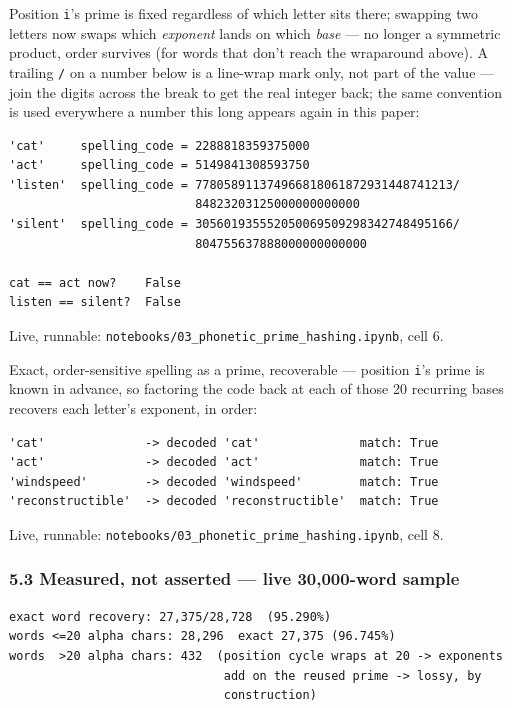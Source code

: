 \documentclass[
  10pt,
]{article}
\begin{document}
Position \texttt{i}'s prime is fixed regardless of which letter sits
there; swapping two letters now swaps which \emph{exponent} lands on
which \emph{base} --- no longer a symmetric product, order survives (for
words that don't reach the wraparound above). A trailing \texttt{/} on a
number below is a line-wrap mark only, not part of the value --- join
the digits across the break to get the real integer back; the same
convention is used everywhere a number this long appears again in this
paper:

\begin{verbatim}
'cat'     spelling_code = 2288818359375000
'act'     spelling_code = 5149841308593750
'listen'  spelling_code = 778058911374966818061872931448741213/
                          84823203125000000000000
'silent'  spelling_code = 305601935552050069509298342748495166/
                          804755637888000000000000

cat == act now?    False
listen == silent?  False
\end{verbatim}

Live, runnable: \texttt{notebooks/03\_phonetic\_prime\_hashing.ipynb},
cell 6.

Exact, order-sensitive spelling as a prime, recoverable --- position
\texttt{i}'s prime is known in advance, so factoring the code back at
each of those 20 recurring bases recovers each letter's exponent, in
order:

\begin{verbatim}
'cat'              -> decoded 'cat'              match: True
'act'              -> decoded 'act'              match: True
'windspeed'        -> decoded 'windspeed'        match: True
'reconstructible'  -> decoded 'reconstructible'  match: True
\end{verbatim}

Live, runnable: \texttt{notebooks/03\_phonetic\_prime\_hashing.ipynb},
cell 8.

\hypertarget{measured-not-asserted-live-30000-word-sample}{%
\subsubsection{5.3 Measured, not asserted --- live 30,000-word
sample}\label{measured-not-asserted-live-30000-word-sample}}

\begin{verbatim}
exact word recovery: 27,375/28,728  (95.290%)
words <=20 alpha chars: 28,296  exact 27,375 (96.745%)
words  >20 alpha chars: 432  (position cycle wraps at 20 -> exponents
                              add on the reused prime -> lossy, by
                              construction)
\end{verbatim}
\end{document}
